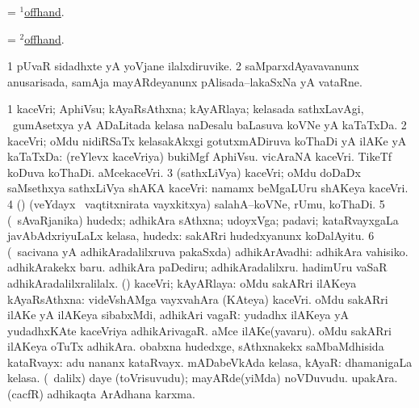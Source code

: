 \bentry
{}
\gl{\gu}
\bmng
= \hyperlink{offhand(1)}{$^1$offhand}. 
\emng
\eentry

\bentry
{}
\gl{\kirxvi}
\bmng
= \hyperlink{offhand(2)}{$^2$offhand}. 
\emng
\eentry

\bentry
{}
\gl{\nA}
\bmng
\bnum
\num{1} pUvaR sidadhxte yA yoVjane ilalxdiruvike. 
\num{2} saMparxdAyavavanunx anusarisada, samAja mayARdeyanunx pAlisada--lakaSxNa yA vataRne. 
\enum
\emng
\eentry

\bentry
{}
\gl{\nA}
\bmng
\bnum
\num{1} kaceVri; AphiVsu; kAyaRsAthxna; kAyARlaya; kelasada sathxLavAgi, \kanmu\ gumAsetxya yA ADaLitada kelasa naDesalu baLasuva koVNe yA kaTaTxDa. 
\num{2} kaceVri; oMdu nidiRSaTx kelasakAkxgi gotutxmADiruva koThaDi yA ilAKe yA kaTaTxDa:  (reYlevx kaceVriya) bukiMgf AphiVsu.  vicAraNA kaceVri.  TikeTf koDuva koThaDi.  aMcekaceVri. 
\num{3} (sathxLiVya) kaceVri; oMdu doDaDx saMsethxya sathxLiVya shAKA kaceVri:  namamx beMgaLUru shAKeya kaceVri. 
\num{4} (\ame) (veYdayx \mo\ vaqtitxnirata vayxkitxya) salahA--koVNe, rUmu, koThaDi. 
\num{5} (\kanmu\ sAvaRjanika) hudedx; adhikAra sAthxna; udoyxVga; padavi; kataRvayxgaLa javAbAdxriyuLaLx kelasa, hudedx:  sakARri hudedxyanunx koDalAyitu. 
\num{6} (\kanmu\ sacivana yA adhikAradalilxruva pakaSxda) adhikArAvadhi:  adhikAra vahisiko.  adhikArakekx baru.  adhikAra paDediru; adhikAradalilxru.  hadimUru vaSaR adhikAradalilxralilalx. 
 () kaceVri; kAyARlaya: 
\banum
{} oMdu sakARri ilAKeya kAyaRsAthxna:  videVshAMga vayxvahAra (KAteya) kaceVri. 
 oMdu sakARri ilAKe yA ilAKeya sibabxMdi, adhikAri vagaR:  yudadhx ilAKeya yA yudadhxKAte kaceVriya adhikArivagaR.  aMce ilAKe(yavaru). 
 oMdu sakARri ilAKeya oTuTx adhikAra. 
\eanum
\numie
{} 
\banum
{} obabxna hudedxge, sAthxnakekx saMbaMdhisida kataRvayx:  adu nananx kataRvayx. 
 mADabeVkAda kelasa, kAyaR:  dhamanigaLa kelasa. 
\eanum
\numie
{} (\sA\ \bava dalilx) 
\banum
{} daye (toVrisuvudu); mayARde(yiMda) noVDuvudu. 
 upakAra. 
\eanum
\numie
{} (cacfR) 
\banum
{} adhikaqta ArAdhana karxma. 
